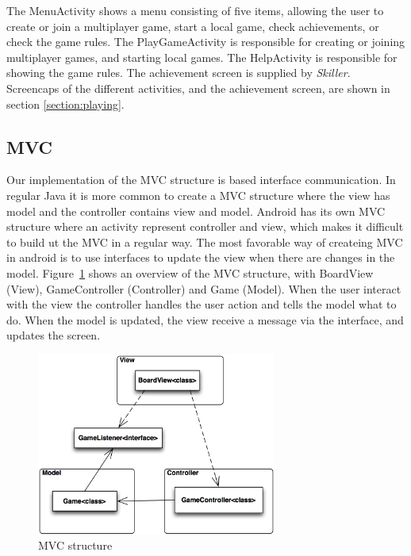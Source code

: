 The MenuActivity shows a menu consisting of five items, allowing the user to create or join a multiplayer game, start a local game, check achievements, or check the game rules. The PlayGameActivity is responsible for creating or joining multiplayer games, and starting local games. The HelpActivity is responsible for showing the game rules. The achievement screen is supplied by \emph{Skiller}.\\

Screencaps of the different activities, and the achievement screen, are shown in section \ref{section:playing}.

\subsection{MVC}

Our implementation of the MVC structure is based interface communication. In regular Java it is more common to create a MVC structure where the view has model and the controller contains view and model. Android has its own MVC structure where an activity represent controller and view, which makes it difficult to build ut the MVC in a regular way. The most favorable way of createing MVC in android is to use interfaces to update the view when there are changes in the model. Figure~\ref{fig:mvc} shows an overview of the MVC structure, with BoardView (View), GameController (Controller) and Game (Model). When the user interact with the view the controller handles the user action and tells the model what to do. When the model is updated, the view receive a message via the interface, and updates the screen.

\begin{figure}[H]
\begin{center}
\includegraphics[width=0.7\textwidth]{Images/mvc}
\caption{MVC structure}
\label{fig:mvc}
\end{center}
\end{figure}

